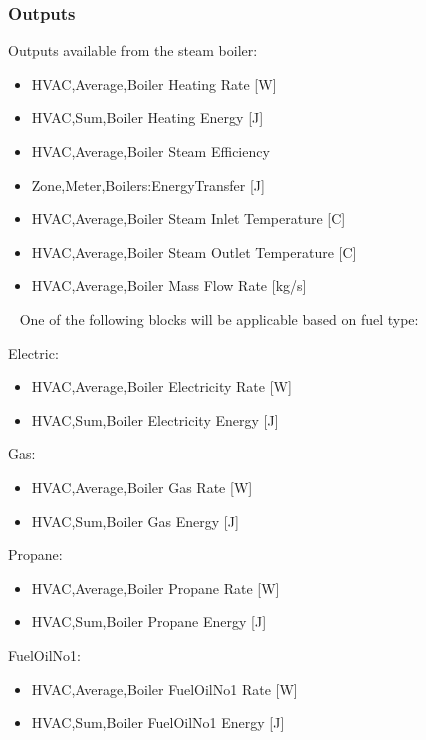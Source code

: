 \subsubsection{Outputs}\label{outputs-11-004}

Outputs available from the steam boiler:

\begin{itemize}
\item
  HVAC,Average,Boiler Heating Rate {[}W{]}
\item
  HVAC,Sum,Boiler Heating Energy {[}J{]}
\item
  HVAC,Average,Boiler Steam Efficiency
\item
  Zone,Meter,Boilers:EnergyTransfer {[}J{]}
\item
  HVAC,Average,Boiler Steam Inlet Temperature {[}C{]}
\item
  HVAC,Average,Boiler Steam Outlet Temperature {[}C{]}
\item
  HVAC,Average,Boiler Mass Flow Rate {[}kg/s{]}
\end{itemize}

~ One of the following blocks will be applicable based on fuel type:

Electric:

\begin{itemize}
\item
  HVAC,Average,Boiler Electricity Rate {[}W{]}
\item
  HVAC,Sum,Boiler Electricity Energy {[}J{]}
\end{itemize}

Gas:

\begin{itemize}
\item
  HVAC,Average,Boiler Gas Rate {[}W{]}
\item
  HVAC,Sum,Boiler Gas Energy {[}J{]}
\end{itemize}

Propane:

\begin{itemize}
\item
  HVAC,Average,Boiler Propane Rate {[}W{]}
\item
  HVAC,Sum,Boiler Propane Energy {[}J{]}
\end{itemize}

FuelOilNo1:

\begin{itemize}
\item
  HVAC,Average,Boiler FuelOilNo1 Rate {[}W{]}
\item
  HVAC,Sum,Boiler FuelOilNo1 Energy {[}J{]}
\end{itemize}

